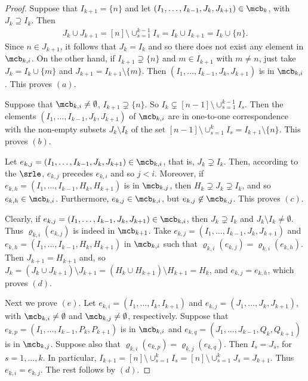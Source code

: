 \begin{proof} 
Suppose that $I_{k+1}=\{n\}$ and let $(I_1,\ldots
,I_{k-1},J_k,J_{k+1})\in\mcb_k$, with $J_k\supseteq I_k$. Then
\begin{eqnarray*}
J_k\cup J_{k+1}=[n]\setminus \cup_{s=1}^{k-1}I_s=I_k\cup I_{k+1}=I_k\cup
\{n\}. 
\end{eqnarray*}
Since $n\in J_{k+1}$, it follows that $J_k=I_k$ and so there
does not exist any element in $\mcb_{k,i}$. On the other hand, if
$I_{k+1}\supsetneq \{n\}$ and $m\in I_{k+1}$ with $m\neq n$, just take
$J_{k}=I_{k}\cup \{m\}$ and $J_{k+1}=I_{k+1}\setminus \{m\}$. Then
$(I_1,\ldots ,I_{k-1},J_k,J_{k+1})$ is in $\mcb_{k,i}$. This proves
$(a)$.

Suppose that $\mcb_{k,i}\neq \emptyset$, \ie $I_{k+1}\supsetneq
\{n\}$. So $I_k\subsetneq [n-1]\setminus \cup_{s=1}^{k-1}I_s$. Then
the elements $(I_1,\ldots ,I_{k-1},J_k,J_{k+1})$ of $\mcb_{k,i}$ are
in one-to-one correspondence with the non-empty subsets $J_k\setminus
I_k$ of the set $[n-1]\setminus \cup_{s=1}^kI_s=I_{k+1}\setminus
\{n\}$. This proves $(b)$.

Let $e_{k,j}=(I_1,\ldots ,I_{k-1},J_k,J_{k+1})\in\mcb_{k,i}$, that is,
$J_k\supsetneq I_k$. Then, according to the $\srle$, $e_{k,j}$
precedes $e_{k,i}$ and so $j<i$. Moreover, if $e_{k,h}=(I_1,\ldots
,I_{k-1},H_k,H_{k+1})$ is in $\mcb_{k,j}$, then $H_k\supsetneq
J_k\supsetneq I_k$, and so $e_{k,h}\in\mcb_{k,i}$. Furthermore,
$e_{k,j}\in\mcb_{k,i}$, but $e_{k,j}\not\in\mcb_{k,j}$. This proves
$(c)$.

Clearly, if $e_{k,j}=(I_1,\ldots ,I_{k-1},J_k,J_{k+1})\in\mcb_{k,i}$,
then $J_k\supsetneq I_k$ and $J_k\setminus I_k\neq \emptyset$. Thus
$\varrho_{k,i}(e_{k,j})$ is indeed in $\mcb_{k+1}$. Take
$e_{k,j}=(I_1,\ldots ,I_{k-1},J_k,J_{k+1})$ and $e_{k,h}=(I_1,\ldots
,I_{k-1},H_k,H_{k+1})$ in $\mcb_{k,i}$ such that
$\varrho_{k,i}(e_{k,j})=\varrho_{k,i}(e_{k,h})$. Then $J_{k+1}=H_{k+1}$
and, so $J_k=(J_{k}\cup J_{k+1})\setminus J_{k+1}= (H_k\cup
H_{k+1})\setminus H_{k+1}=H_k$, and $e_{k,j}=e_{k,h}$, which proves
$(d)$.

Next we prove $(e)$. Let $e_{k,i}=(I_1,\ldots ,I_k,I_{k+1})$ and
$e_{k,j}=(J_1,\ldots ,J_k,J_{k+1})$, with $\mcb_{k,i}\neq \emptyset$
and $\mcb_{k,j}\neq \emptyset$, respectively.  Suppose that
$e_{k,p}=(I_1,\ldots ,I_{k-1},P_k,P_{k+1})$ is in $\mcb_{k,i}$ and
$e_{k,q}=(J_1,\ldots ,J_{k-1},Q_k,Q_{k+1})$ is in
$\mcb_{k,j}$. Suppose also that
$\varrho_{k,i}(e_{k,p})=\varrho_{k,j}(e_{k,q})$. Then $I_s=J_s$, for
$s=1,\ldots ,k$. In particular, $I_{k+1}=[n]\setminus
\cup_{s=1}^kI_s=[n]\setminus\cup_{s=1}^kJ_s=J_{k+1}$. Thus
$e_{k,i}=e_{k,j}$. The rest follows by $(d)$.


\end{proof}
